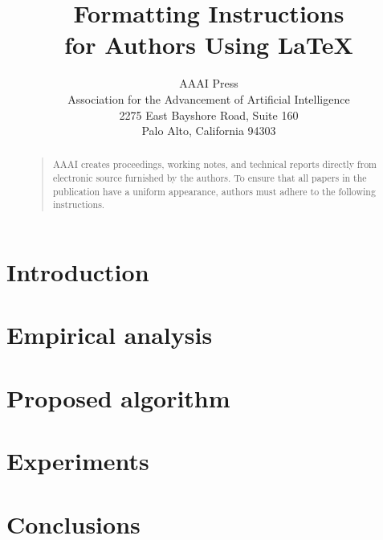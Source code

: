 \documentclass[letterpaper]{article}
\begin{document}
%

\newcommand{\xhedit}[1]{{\color{blue} #1}}
\newcommand{\xhcomment}[1]{\xhedit{[XH: #1]}}

\newcommand{\ISM}{A}
\newcommand{\IS}{\alpha}

\newcommand{\DS}{P}

\newcommand{\NActNodes}{N}


\title{Formatting Instructions \\for Authors Using \LaTeX{}}
\author{AAAI Press\\
Association for the Advancement of Artificial Intelligence\\
2275 East Bayshore Road, Suite 160\\
Palo Alto, California 94303\\
}
\maketitle
\begin{abstract}
\begin{quote}
AAAI creates proceedings, working notes, and technical reports directly from electronic source furnished by the authors. To ensure that all papers in the publication have a uniform appearance, authors must adhere to the following instructions. 
\end{quote}
\end{abstract}
\section{Introduction}

\section{Empirical analysis}

\section{Proposed algorithm}

\section{Experiments}

\section{Conclusions}


\end{document}
